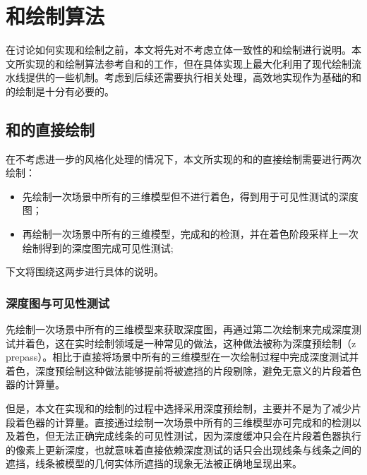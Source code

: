 \chapter{\con{}和\scon{}绘制算法}

在讨论如何实现\stc{}\con{}和\scon{}绘制之前，本文将先对不考虑立体一致性的\con{}和\scon{}绘制进行说明。本文所实现的\con{}和\scon{}绘制算法参考自\citeauthor{northrup2000artistic}和\citeauthor{isenberg2002stylizing}的工作\cite{northrup2000artistic,isenberg2002stylizing}，但在具体实现上最大化利用了现代绘制流水线提供的一些机制。考虑到后续还需要执行\stc{}相关处理，高效地实现作为基础的\con{}和\scon{}的绘制是十分有必要的。

\section{\con{}和\scon{}的直接绘制}
\label{sec:basic}

在不考虑进一步的风格化处理的情况下，本文所实现的\con{}和\scon{}的直接绘制需要进行两次绘制：

\begin{itemize}
    \item 先绘制一次场景中所有的三维模型但不进行着色，得到用于可见性测试的深度图；
    \item 再绘制一次场景中所有的三维模型，完成\con{}和\scon{}的检测，并在着色阶段采样上一次绘制得到的深度图完成可见性测试;
\end{itemize}

下文将围绕这两步进行具体的说明。

\subsection{深度图与可见性测试}

先绘制一次场景中所有的三维模型来获取深度图，再通过第二次绘制来完成深度测试并着色，这在实时绘制领域是一种常见的做法，这种做法被称为深度预绘制（z prepass）。相比于直接将场景中所有的三维模型在一次绘制过程中完成深度测试并着色，深度预绘制这种做法能够提前将被遮挡的片段剔除，避免无意义的片段着色器的计算量。

但是，本文在实现\con{}和\scon{}的绘制的过程中选择采用深度预绘制，主要并不是为了减少片段着色器的计算量。直接通过绘制一次场景中所有的三维模型亦可完成\con{}和\scon{}的检测以及着色，但无法正确完成线条的可见性测试，因为深度缓冲只会在片段着色器执行的像素上更新深度，也就意味着直接依赖深度测试的话只会出现线条与线条之间的遮挡，线条被模型的几何实体所遮挡的现象无法被正确地呈现出来。

